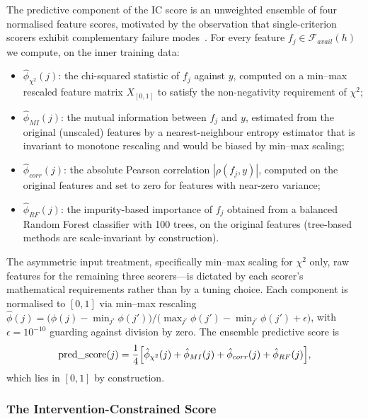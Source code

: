 \documentclass[a4paper,fleqn]{cas-sc}
\begin{document}
The predictive component of the IC score is an unweighted ensemble of four normalised feature scores, motivated by the observation that single-criterion scorers exhibit complementary failure modes~\citep{li2017,pes2020,chandrashekar2014}. For every feature $f_j \in \mathcal{F}_{avail}(h)$ we compute, on the inner training data:
\begin{itemize}
    \item $\hat\phi_{\chi^2}(j)$: the chi-squared statistic of $f_j$
          against $y$, computed on a min--max rescaled feature matrix
          $X_{[0, 1]}$ to satisfy the non-negativity requirement of
          $\chi^2$;
    \item $\hat\phi_{MI}(j)$: the mutual information between $f_j$ and
          $y$, estimated from the original (unscaled) features by a
          nearest-neighbour entropy estimator that is invariant to
          monotone rescaling and would be biased by min--max scaling;
    \item $\hat\phi_{corr}(j)$: the absolute Pearson correlation
          $|\rho(f_j, y)|$, computed on the original features and set to
          zero for features with near-zero variance;
    \item $\hat\phi_{RF}(j)$: the impurity-based importance of $f_j$
          obtained from a balanced Random Forest classifier with 100
          trees, on the original features (tree-based methods are
          scale-invariant by construction).
\end{itemize}
The asymmetric input treatment, specifically min--max scaling for $\chi^2$ only, raw features for the remaining three scorers---is dictated by each scorer's mathematical requirements rather than by a tuning choice. Each component is normalised to $[0, 1]$ via min--max rescaling $\hat\phi(j) = \bigl(\phi(j) - \min_{j'}\phi(j')\bigr) /
\bigl(\max_{j'}\phi(j') - \min_{j'}\phi(j') + \epsilon\bigr)$, with $\epsilon = 10^{-10}$ guarding against division by zero. The ensemble predictive score is
\begin{equation}
    \mathrm{pred\_score}(j)
    = \frac{1}{4}
    \Bigl[
        \hat\phi_{\chi^2}(j) + \hat\phi_{MI}(j)
        + \hat\phi_{corr}(j) + \hat\phi_{RF}(j)
    \Bigr],
    \label{eq:pred_score}
\end{equation}
which lies in $[0, 1]$ by construction.

\subsubsection{The Intervention-Constrained Score}
\label{sec:icfs:ic_score}
\end{document}
